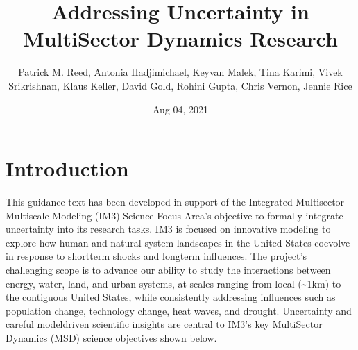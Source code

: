 \documentclass[letterpaper,10pt,english]{sphinxmanual}
\title{Addressing Uncertainty in MultiSector Dynamics Research}
\date{Aug 04, 2021}
\author{Patrick M.\@{} Reed, Antonia Hadjimichael, Keyvan Malek, Tina Karimi, Vivek Srikrishnan, Klaus Keller, David Gold, Rohini Gupta, Chris Vernon, Jennie Rice}
\begin{document}
\pagestyle{empty}
\sphinxmaketitle
\pagestyle{plain}
\sphinxtableofcontents
\pagestyle{normal}
\label{\detokenize{index::doc}}



\chapter{Introduction}
\label{\detokenize{1_introduction:introduction}}\label{\detokenize{1_introduction:id1}}\label{\detokenize{1_introduction::doc}}
\sphinxAtStartPar
This guidance text has been developed in support of the Integrated Multisector Multiscale Modeling (IM3) Science Focus Area’s objective to formally integrate uncertainty into its research tasks. IM3 is focused on innovative modeling to explore how human and natural system landscapes in the United States co\sphinxhyphen{}evolve in response to short\sphinxhyphen{}term shocks and long\sphinxhyphen{}term influences. The project’s challenging scope is to advance our ability to study the interactions between energy, water, land, and urban systems, at scales ranging from local (\textasciitilde{}1km) to the contiguous United States, while consistently addressing influences such as population change, technology change, heat waves, and drought. Uncertainty and careful model\sphinxhyphen{}driven scientific insights are central to IM3’s key MultiSector Dynamics (MSD) science objectives shown below.

\sphinxAtStartPar
{}

\sphinxAtStartPar
{}

\sphinxAtStartPar
{}

\sphinxAtStartPar
{}
\end{document}
